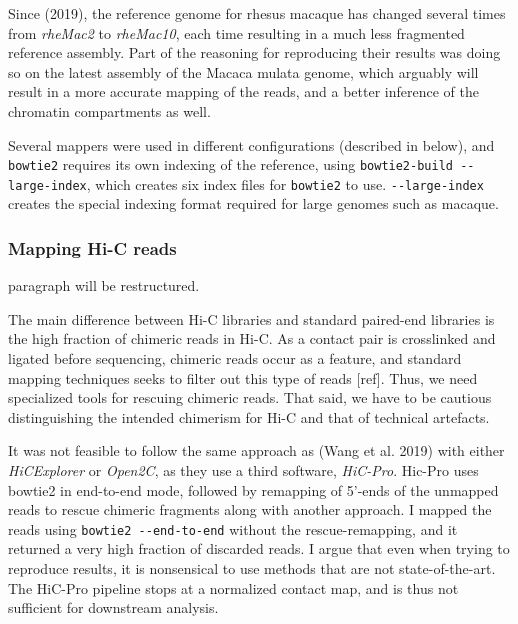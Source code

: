 \documentclass[
  11pt,
  a4paper,
]{scrbook}
\let\oldemph\emph
\renewcommand\emph[1]{\oldemph{\color{gray}#1}}
\begin{document}
Since (2019), the reference genome for rhesus macaque has changed
several times from \emph{rheMac2} to \emph{rheMac10}, each time
resulting in a much less fragmented reference assembly. Part of the
reasoning for reproducing their results was doing so on the latest
assembly of the Macaca mulata genome, which arguably will result in a
more accurate mapping of the reads, and a better inference of the
chromatin compartments as well.

Several mappers were used in different configurations (described in
below), and \texttt{bowtie2} requires its own indexing of the reference,
using \texttt{bowtie2-build\ -\/-large-index}, which creates six index
files for \texttt{bowtie2} to use. \texttt{-\/-large-index} creates the
special indexing format required for large genomes such as macaque.

\subsubsection{Mapping Hi-C reads}\label{mapping-hi-c-reads}

paragraph will be restructured.

The main difference between Hi-C libraries and standard paired-end
libraries is the high fraction of chimeric reads in Hi-C. As a contact
pair is crosslinked and ligated before sequencing, chimeric reads occur
as a feature, and standard mapping techniques seeks to filter out this
type of reads {[}ref{]}. Thus, we need specialized tools for rescuing
chimeric reads. That said, we have to be cautious distinguishing the
intended chimerism for Hi-C and that of technical artefacts.

It was not feasible to follow the same approach as (Wang et al. 2019)
with either \emph{HiCExplorer} or \emph{Open2C}, as they use a third
software, \emph{HiC-Pro}. Hic-Pro uses bowtie2 in end-to-end mode,
followed by remapping of 5'-ends of the unmapped reads to rescue
chimeric fragments along with another approach. I mapped the reads using
\texttt{bowtie2\ -\/-end-to-end} without the rescue-remapping, and it
returned a very high fraction of discarded reads. I argue that even when
trying to reproduce results, it is nonsensical to use methods that are
not state-of-the-art. The HiC-Pro pipeline stops at a normalized contact
map, and is thus not sufficient for downstream analysis.
\end{document}
